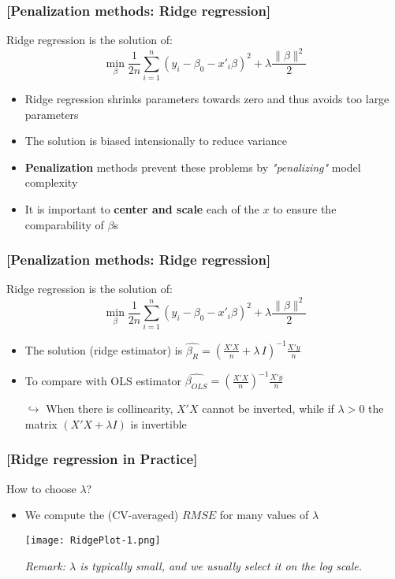 \documentclass[xcolor=x11names,compress]{beamer}
\renewcommand{\(}{\begin{columns}}
\renewcommand{\)}{\end{columns}}
\newcommand{\<}[1]{\begin{column}{#1}}
\renewcommand{\>}{\end{column}}
\begin{document}
\begin{frame} %
\frametitle{\textcolor{brique}{[Penalization methods: Ridge regression]}}
Ridge regression is  the solution of:
$$
\min_{\beta} \frac{1}{2n}
\sum_{i=1}^{n}{ \left( y_i - \beta_0 - x'_i\beta\right)^{2} } +
\lambda \frac{\| \beta\|^{2}}{2}
$$
\pause
\begin{itemize}[<+->]
\item Ridge regression shrinks parameters towards zero and thus avoids too large parameters
\item The solution is biased intensionally to reduce variance
\item \textbf{Penalization} methods prevent these problems by \emph{"penalizing"} model complexity
\item It is important to \textbf{center and scale}  each of the $x$ to ensure the comparability of $\beta$s
\end{itemize}
\end{frame}


\begin{frame} %
\frametitle{\textcolor{brique}{[Penalization methods: Ridge regression]}}
Ridge regression is  the solution of:
$$
\min_{\beta} \frac{1}{2n}
\sum_{i=1}^{n}{ \left( y_i - \beta_0 - x'_i\beta\right)^{2} } +
\lambda \frac{\| \beta\|^{2}}{2}
$$
\pause
\begin{itemize}[<+->]
\item The solution (ridge estimator) is $\widehat{\beta_R} = \left( \frac{X'X}{n} + \lambda \, I \right)^{-1} \frac{X' y}{n}$
\item To compare with OLS estimator  $ \widehat{\beta_{OLS}} = \left( \frac{X'X}{n}\right)^{-1} \frac{X' y}{n} $
\item[$\hookrightarrow$] When there is collinearity, $X'X$ cannot be inverted, while if $\lambda >0$ the matrix $ \left( X'X + \lambda I \right)$ is invertible
\end{itemize}
\end{frame}

\begin{frame} %
\frametitle{\textcolor{brique}{[Ridge regression in Practice]}}
How to choose $\lambda$?
\pause
\begin{itemize}[<+->]
\item We compute the (CV-averaged) $RMSE$ for many values of $\lambda$
\item[]  \texttt{[image: RidgePlot-1.png]}
\item[]\emph{Remark: $\lambda$ is typically small, and we usually select it on the log scale.}
\end{itemize}
\end{frame}
\end{document}

